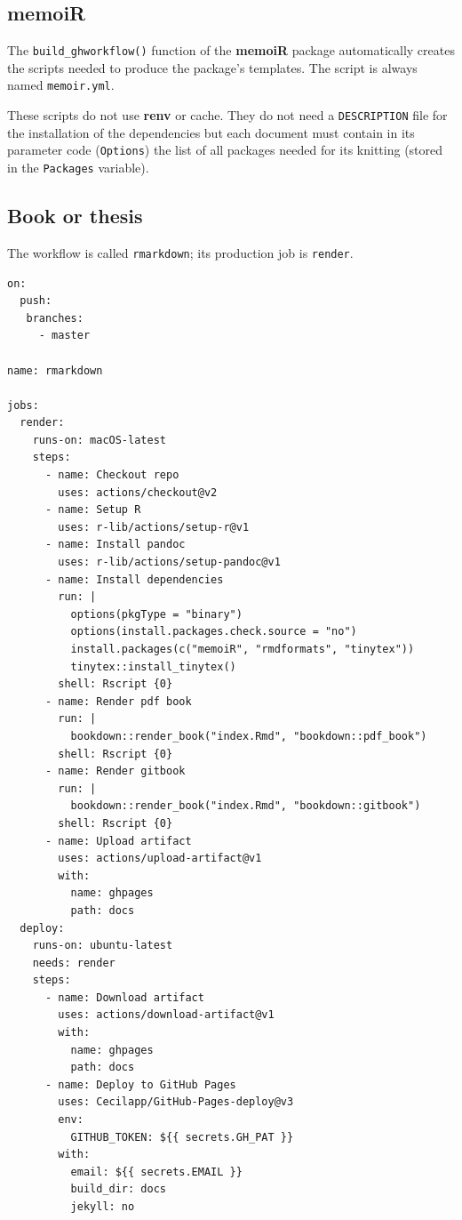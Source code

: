 \documentclass[
  12pt,
  american,
  a4paper,
  extrafontsizes,onecolumn,openright
  ]{memoir}
\begin{document}
\hypertarget{sec:memoiR-ci}{%
\subsection{memoiR}\label{sec:memoiR-ci}}

The \texttt{build\_ghworkflow()} function of the \textbf{memoiR} package automatically creates the scripts needed to produce the package's templates.
The script is always named \texttt{memoir.yml}.

These scripts do not use \textbf{renv} or cache.
They do not need a \texttt{DESCRIPTION} file for the installation of the dependencies but each document must contain in its parameter code (\texttt{Options}) the list of all packages needed for its knitting (stored in the \texttt{Packages} variable).

\hypertarget{sec:bookdown-ci}{%
\subsection{Book or thesis}\label{sec:bookdown-ci}}

The workflow is called \texttt{rmarkdown}; its production job is \texttt{render}.

\begin{verbatim}
on:
  push:
   branches:
     - master

name: rmarkdown

jobs:
  render:
    runs-on: macOS-latest
    steps:
      - name: Checkout repo
        uses: actions/checkout@v2
      - name: Setup R
        uses: r-lib/actions/setup-r@v1
      - name: Install pandoc
        uses: r-lib/actions/setup-pandoc@v1
      - name: Install dependencies
        run: |
          options(pkgType = "binary")
          options(install.packages.check.source = "no")
          install.packages(c("memoiR", "rmdformats", "tinytex"))
          tinytex::install_tinytex()
        shell: Rscript {0}
      - name: Render pdf book
        run: |
          bookdown::render_book("index.Rmd", "bookdown::pdf_book")
        shell: Rscript {0}
      - name: Render gitbook
        run: |
          bookdown::render_book("index.Rmd", "bookdown::gitbook")
        shell: Rscript {0}
      - name: Upload artifact
        uses: actions/upload-artifact@v1
        with:
          name: ghpages
          path: docs
  deploy:
    runs-on: ubuntu-latest
    needs: render
    steps:
      - name: Download artifact
        uses: actions/download-artifact@v1
        with:
          name: ghpages
          path: docs
      - name: Deploy to GitHub Pages
        uses: Cecilapp/GitHub-Pages-deploy@v3
        env:
          GITHUB_TOKEN: ${{ secrets.GH_PAT }}
        with:
          email: ${{ secrets.EMAIL }}
          build_dir: docs
          jekyll: no
\end{verbatim}
\end{document}
